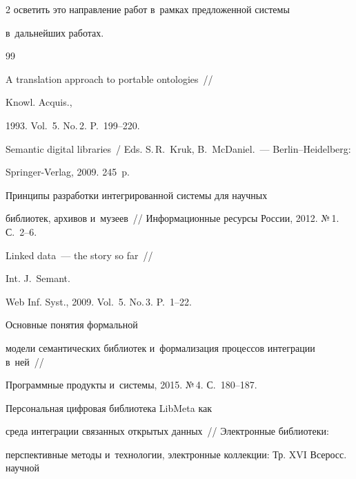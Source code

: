 \begin{multicols}{2}
осветить это направление работ в~рамках предложенной системы 

в~дальнейших работах.

    

{\small\frenchspacing

 {%


 \begin{thebibliography}{99}


 A translation approach to portable ontologies~// 

Knowl. Acquis., 

1993. Vol.~5. No.\,2. P.~199--220. 


Semantic digital libraries~/ Eds. S.\,R.~Kruk, B.~McDaniel.~--- Berlin--Heidelberg:  

Springer-Verlag, 2009. 245~p.


 Принципы разработки интегрированной системы для научных 

библиотек, архивов и~музеев~// Информационные ресурсы России, 2012. №\,1. С.~2--6.


 Linked data~--- the story so far~// 

Int. J.~Semant. 

Web Inf. Syst., 2009. Vol.~5. No.\,3. P.~1--22.


 Основные понятия формальной 

модели семантических библиотек и~формализация процессов интеграции в~ней~// 

Программные продукты и~системы, 2015. №\,4. С.~180--187.


 Персональная циф\-ровая библиотека LibMeta как 

среда интеграции связан\-ных открытых данных~// Электронные биб\-лио\-те\-ки: 

перспективные методы и~технологии, электронные коллекции: Тр. XVI Всеросс. научной 


\end{thebibliography}}}
\end{multicols}
